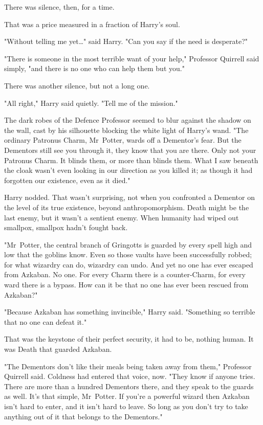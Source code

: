 There was silence, then, for a time.

That was a price measured in a fraction of Harry’s soul.

"Without telling me yet…" said Harry. "Can you say if the need is
desperate?"

"There is someone in the most terrible want of your help," Professor Quirrell
said simply, "and there is no one who can help them but you."

There was another silence, but not a long one.

"All right," Harry said quietly. "Tell me of the mission."

The dark robes of the Defence Professor seemed to blur against the shadow on
the wall, cast by his silhouette blocking the white light of Harry’s wand. "The
ordinary Patronus Charm, Mr~Potter, wards off a Dementor’s fear. But the
Dementors still see you through it, they know that you are there. Only not your
Patronus Charm. It blinds them, or more than blinds them. What I saw beneath
the cloak wasn’t even looking in our direction as you killed it; as though it
had forgotten our existence, even as it died."

Harry nodded. That wasn’t surprising, not when you confronted a Dementor on the
level of its true existence, beyond anthropomorphism. Death might be the last
enemy, but it wasn’t a sentient enemy. When humanity had wiped out smallpox,
smallpox hadn’t fought back.

"Mr~Potter, the central branch of Gringotts is guarded by every spell high and
low that the goblins know. Even so those vaults have been successfully robbed;
for what wizardry can do, wizardry can undo. And yet no one has ever escaped
from Azkaban. No one. For every Charm there is a counter-Charm, for every ward
there is a bypass. How can it be that no one has ever been rescued from
Azkaban?"

"Because Azkaban has something invincible," Harry said. "Something so terrible
that no one can defeat it."

That was the keystone of their perfect security, it had to be, nothing human.
It was Death that guarded Azkaban.

"The Dementors don’t like their meals being taken away from them," Professor
Quirrell said. Coldness had entered that voice, now. "They know if anyone
tries. There are more than a hundred Dementors there, and they speak to the
guards as well. It’s that simple, Mr~Potter. If you’re a powerful wizard then
Azkaban isn’t hard to enter, and it isn’t hard to leave. So long as you don’t
try to take anything out of it that belongs to the Dementors."

